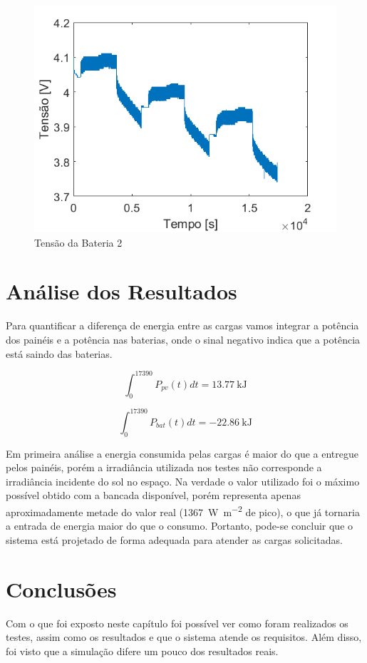 \begin{figure}[!htpb]
\begin{center}
\includegraphics[scale=0.5]{figures/testBat2Voltage.png}
\caption{Tensão da Bateria 2}
\label{figura_teste_tensao_bat2}
\end{center}
\end{figure}

\section{Análise dos Resultados}

Para quantificar a diferença de energia entre as cargas vamos integrar a potência dos painéis e a potência nas baterias, onde o sinal negativo indica que a potência está saindo das baterias.

\begin{equation}
\int_{0}^{17390} P_{pv}(t) dt = \SI{13.77}{\kilo\joule}
\end{equation} 

\begin{equation}
\int_{0}^{17390} P_{bat}(t) dt = \SI{-22.86}{\kilo\joule}
\end{equation}

Em primeira análise a energia consumida pelas cargas é maior do que a entregue pelos painéis, porém a irradiância utilizada nos testes não corresponde a irradiância incidente do sol no espaço. Na verdade o valor utilizado foi o máximo possível obtido com a bancada disponível, porém representa apenas aproximadamente metade do valor real (\SI{1367}{\watt\per\square\metre} de pico), o que já tornaria a entrada de energia maior do que o consumo. Portanto, pode-se concluir que o sistema está projetado de forma adequada para atender as cargas solicitadas.

\section{Conclusões}

Com o que foi exposto neste capítulo foi possível ver como foram realizados os testes, assim como os resultados e que o sistema atende os requisitos. Além disso, foi visto que a simulação difere um pouco dos resultados reais.